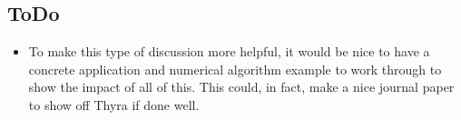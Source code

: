 \subsection{ToDo}

\begin{itemize}

{}\item To make this type of discussion more helpful, it would be nice to have
a concrete application and numerical algorithm example to work through to show
the impact of all of this.  This could, in fact, make a nice journal paper to
show off Thyra if done well.

\end{itemize}
